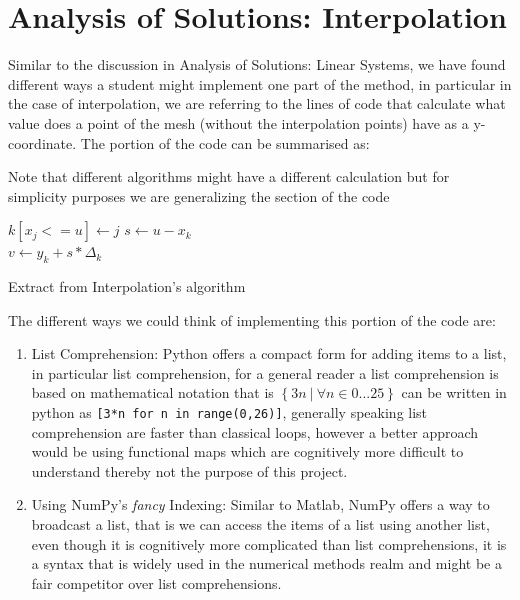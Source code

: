 \section{Analysis of Solutions: Interpolation}
Similar to the discussion in Analysis of Solutions: Linear Systems, we have found different ways a student might implement one part of the method, in particular in the case of interpolation, we are referring to the lines of code that calculate what value does a point of the mesh (without the interpolation points) have as a y-coordinate. The portion of the code can be summarised as: 

Note that different algorithms might have a different calculation but for simplicity purposes we are generalizing the section of the code


\begin{algorithm}[H]
\SetAlgoLined
{} {
$k[x_j <= u] \gets j$
}
$s \gets u - x_k$\\
$v \gets y_k + s * \Delta_k$

\caption{Extract from Interpolation's algorithm}
\end{algorithm}

The different ways we could think of implementing this portion of the code are:
\begin{enumerate}
    \item List Comprehension: Python offers a compact form for adding items to a list, in particular list comprehension, for a general reader a list comprehension is based on mathematical notation that is $\left\{ 3n\ |\ \forall n\in 0...25\right\}$ can be written in python as \lstinline|[3*n for n in range(0,26)]|, generally speaking list comprehension are faster than classical loops\cite{PythonSpeedPerformanceTips}, however a better approach would be using functional maps which are cognitively more difficult to understand thereby not the purpose of this project.

    \item Using NumPy's \textit{fancy} Indexing: Similar to Matlab, NumPy offers a way to broadcast a list, that is we can access the items of a list using another list, even though it is cognitively more complicated than list comprehensions, it is a syntax that is widely used in the numerical methods realm and might be a fair competitor over list comprehensions.
    
\end{enumerate}

